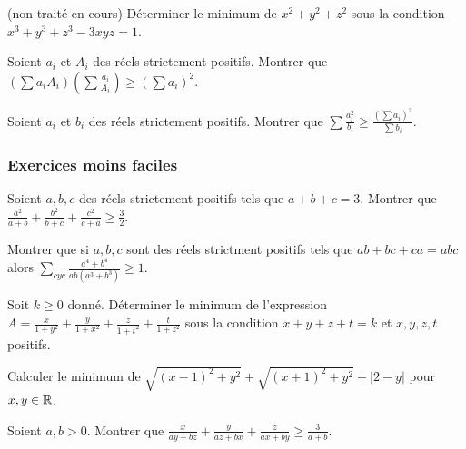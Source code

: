 \begin{exo} (non trait\'e en cours)
 D\'eterminer le minimum de $x^2+y^2+z^2$ sous la condition $x^3+y^3+z^3-3xyz=1$.
\end{exo}

\begin{exo}
 Soient $a_i$ et $A_i$ des r\'eels strictement positifs. Montrer que $(\sum a_iA_i)(\sum \frac{a_i}{A_i})\geqslant (\sum a_i)^2$.
\end{exo}

\begin{exo}
 Soient $a_i$ et $b_i$ des r\'eels strictement positifs. Montrer que $\sum\frac{a_i^2}{b_i}\geqslant \frac{(\sum a_i)^2}{\sum b_i}$.
\end{exo}


\subsubsection{Exercices moins faciles}

\begin{exo}
 Soient $a,b,c$ des r\'eels strictement positifs tels que $a+b+c=3$. Montrer que $\frac{a^2}{a+b}+\frac{b^2}{b+c}+\frac{c^2}{c+a}\geqslant\frac{3}{2}$.
\end{exo}


\begin{exo}
 Montrer que si $a,b,c$ sont des r\'eels strictment positifs tels que $ab+bc+ca=abc$ alors $\sum_{cyc}\frac{a^4+b^4}{ab(a^3+b^3)}\geqslant 1$.
\end{exo}

\begin{exo}
 Soit $k\geqslant 0$ donn\'e. D\'eterminer le minimum de l'expression $A=\frac{x}{1+y^2}+\frac{y}{1+x^2}+\frac{z}{1+t^2}+\frac{t}{1+z^2}$ sous
la condition $x+y+z+t=k$ et $x,y,z,t$ positifs.
\end{exo}

\begin{exo}
 Calculer le minimum de $\sqrt{(x-1)^2+y^2}+\sqrt{(x+1)^2+y^2}+|2-y|$ pour $x,y\in \mathbb R$.
\end{exo}

\begin{exo}
 Soient $a,b>0$. Montrer que $\frac{x}{ay+bz}+\frac{y}{az+bx}+\frac{z}{ax+by}\geqslant \frac{3}{a+b}$.
\end{exo}


